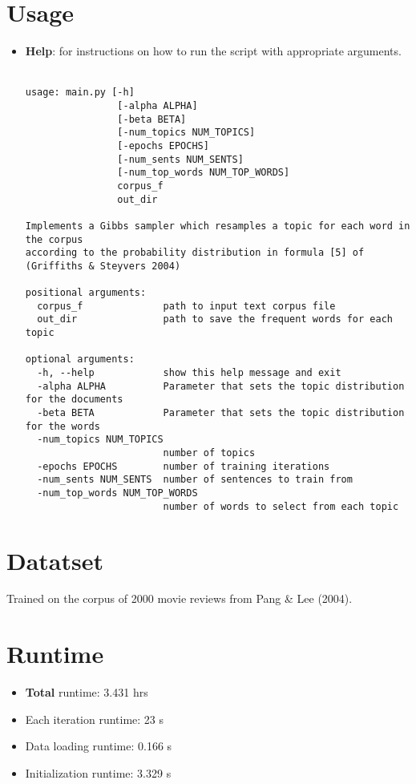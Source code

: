 \documentclass{article}[a4paper]
\begin{document}
\section{Usage}
\begin{itemize}
    \item \textbf{Help}: for instructions on how to run the script with appropriate arguments.\\
        \\
        \begin{lstlisting}[basicstyle=\small]
usage: main.py [-h] 
                [-alpha ALPHA] 
                [-beta BETA] 
                [-num_topics NUM_TOPICS] 
                [-epochs EPOCHS] 
                [-num_sents NUM_SENTS]
                [-num_top_words NUM_TOP_WORDS]
                corpus_f 
                out_dir

Implements a Gibbs sampler which resamples a topic for each word in the corpus 
according to the probability distribution in formula [5] of 
(Griffiths & Steyvers 2004)

positional arguments:
  corpus_f              path to input text corpus file
  out_dir               path to save the frequent words for each topic

optional arguments:
  -h, --help            show this help message and exit
  -alpha ALPHA          Parameter that sets the topic distribution for the documents
  -beta BETA            Parameter that sets the topic distribution for the words
  -num_topics NUM_TOPICS
                        number of topics
  -epochs EPOCHS        number of training iterations
  -num_sents NUM_SENTS  number of sentences to train from
  -num_top_words NUM_TOP_WORDS
                        number of words to select from each topic

        \end{lstlisting}

\end{itemize}


\section{Datatset}
Trained on the corpus of 2000 movie reviews from Pang \& Lee (2004).

\section{Runtime}
\begin{itemize}
    \item \textbf{Total} runtime: 3.431 hrs
    \item Each iteration runtime: 23 s
    \item Data loading runtime: 0.166 s
    \item Initialization runtime: 3.329 s
\end{itemize}
\end{document}
